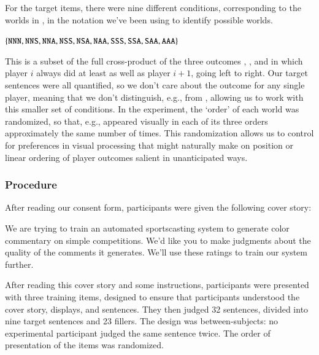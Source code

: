 \documentclass[leqno,12pt]{article}
\begin{document}
For the target items, there were nine different conditions,
corresponding to the worlds in , in the notation we've been
using to identify possible worlds.
%
\begin{examples}
\item\label{conds} $\left\{ \texttt{NNN}, \texttt{NNS}, \texttt{NNA},
    \texttt{NSS}, \texttt{NSA}, \texttt{NAA}, \texttt{SSS}, \texttt{SSA},
    \texttt{SAA}, \texttt{AAA} \right\}$
\end{examples}
%
%
This is a subset of the full cross-product of the three outcomes
, , and  in which player $i$ always did at
least as well as player $i+1$, going left to right.  Our target
sentences were all quantified, so we don't care about the outcome for
any single player, meaning that we don't distinguish, e.g.,
 from , allowing us to work with this smaller
set of conditions. In the experiment, the `order' of each world was
randomized, so that, e.g.,  appeared visually in each of
its three orders approximately the same number of times. This
randomization allows us to control for preferences in visual
processing that might naturally make on position or linear ordering of
player outcomes salient in unanticipated ways.

\subsubsection{Procedure} 

After reading our consent form, participants were given the following
cover story:
%
\begin{examples}
\item\label{coverstory}
  We are trying to train an automated sportscasting system to generate
  color commentary on simple competitions. We'd like you to make
  judgments about the quality of the comments it generates. We'll use
  these ratings to train our system further.
\end{examples}

After reading this cover story and some instructions, participants
were presented with three training items, designed to ensure that
participants understood the cover story, displays, and sentences. They
then judged 32 sentences, divided into nine target sentences and 23
fillers. The design was between-subjects: no experimental participant
judged the same sentence twice. The order of presentation of the items
was randomized.
 
\end{document}
